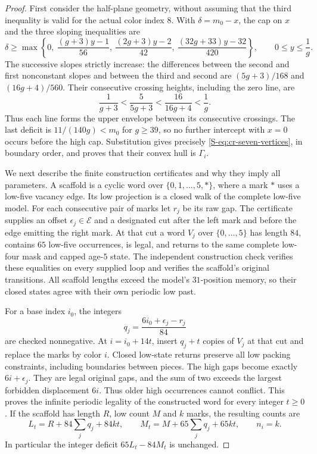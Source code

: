 \documentclass[11pt,reqno]{amsart}
\theoremstyle{plain}
\theoremstyle{plain}
\theoremstyle{plain}
\begin{document}
\begin{proof}
First consider the half-plane geometry, without assuming that the
third inequality is valid for the actual color index $8$. With
$\delta=m_0-x$, the cap on $x$ and the three sloping inequalities are
\[
 \delta\ge\max\left\{
 0,\ \frac{(g+3)y-1}{56},\
 \frac{(2g+3)y-2}{42},\
 \frac{(32g+33)y-32}{420}\right\},\qquad 0\le y\le\frac1g.
\]
The successive slopes strictly increase: the differences between
the second and first nonconstant slopes and between the third
and second are $(5g+3)/168$ and $(16g+4)/560$. Their consecutive
crossing heights, including the zero line, are
\[
 \frac1{g+3}<\frac5{5g+3}<\frac{16}{16g+4}<\frac1g.
\]
Thus each line forms the upper envelope between its consecutive
crossings. The last deficit is $11/(140g)<m_0$ for $g\ge39$,
so no further intercept with $x=0$ occurs before the high cap.
Substitution gives precisely \eqref{S-eq:cr-seven-vertices}, in
boundary order, and proves that their convex hull is $\Gamma_i$.

We next describe the finite construction certificates and why they
imply all parameters. A scaffold is a cyclic word over
$\{0,1,\ldots,5,*\}$, where a mark $*$ uses a low-five vacancy edge.
Its low projection is a closed walk of the complete low-five model.
For each consecutive pair of marks let $r_j$ be its raw gap. The
certificate supplies an offset $\epsilon_j\in\mathcal E$ and a
designated cut after the left mark and before the edge emitting the
right mark. At that cut a word $V_j$ over $\{0,\ldots,5\}$ has
length $84$, contains $65$ low-five occurrences, is legal, and
returns to the same complete low-four mask and capped age-$5$ state.
The independent construction check verifies these equalities on
every supplied loop and verifies the scaffold's original transitions.
All scaffold lengths exceed the model's $31$-position memory, so
their closed states agree with their own periodic low past.

For a base index $i_0$, the integers
\[
 q_j=\frac{6i_0+\epsilon_j-r_j}{84}
\]
are checked nonnegative. At $i=i_0+14t$, insert $q_j+t$ copies
of $V_j$ at that cut and replace the marks by color $i$.
Closed low-state returns preserve all low packing constraints,
including boundaries between pieces. The high gaps become exactly
$6i+\epsilon_j$. They are legal original gaps, and the sum of two
exceeds the largest forbidden displacement $6i$. Thus older high
occurrences cannot conflict. This proves the infinite periodic
legality of the constructed word for every integer $t\ge0$.
If the scaffold has length $R$, low count $M$ and $k$ marks,
the resulting counts are
\begin{equation}\label{S-eq:cr-loop-counts}
 L_t=R+84\sum_jq_j+84kt,\qquad
 M_t=M+65\sum_jq_j+65kt,\qquad n_i=k.
\end{equation}
In particular the integer deficit $65L_t-84M_t$ is unchanged.


\end{proof}
\end{document}
